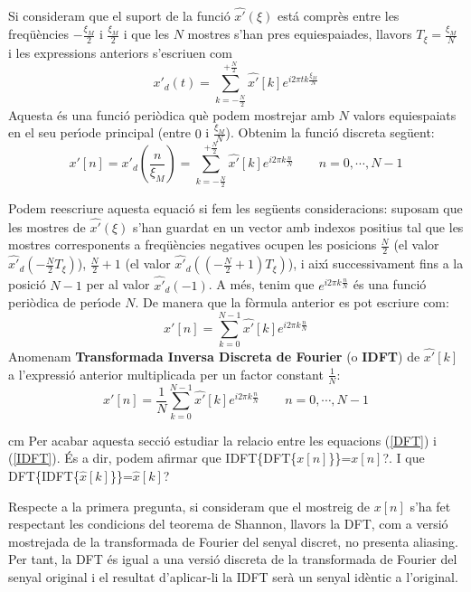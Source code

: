 \documentclass{article}
\begin{document}
Si consideram que el suport de la funci\'o $\widehat{x'}(\xi)$ est\'a compr\`es entre
les freq\"u\`encies $-\frac{\xi_M}{2}$ i $\frac{\xi_M}{2}$ i que les $N$ mostres
s'han pres equiespaiades, llavors $T_\xi=\frac{\xi_M}{N}$ i les expressions anteriors
s'escriuen com
\begin{equation}
\label{idftcont}
x'_d(t)=\sum_{k=-\frac{N}{2}}^{+\frac{N}{2}} \widehat{x'}[k] e^{i 2 \pi t k \frac{\xi_M}{N}}
\end{equation}
Aquesta \'es una funci\'o peri\`odica qu\`e podem mostrejar amb $N$ valors equiespaiats
en el seu per\'\i ode principal (entre $0$ i $\frac{\xi_M}{N}$). Obtenim la funci\'o
discreta seg\"uent:
\[
x'[n]=x'_d(\frac{n}{\xi_M})=
\sum_{k=-\frac{N}{2}}^{+\frac{N}{2}} \widehat{x'}[k] e^{i 2 \pi k \frac{n}{N}}
\qquad n=0,\cdots, N-1
\]

Podem reescriure aquesta equaci\'o si fem les seg\"uents consideracions: 
suposam que les mostres de $\widehat{x'}(\xi)$ s'han guardat en un vector amb
indexos positius
tal que les mostres corresponents a freq\"u\`encies negatives ocupen les posicions
$\frac{N}{2}$ (el valor $\widehat{x'}_d(-\frac{N}{2}T_\xi)$), 
$\frac{N}{2}+1$ (el valor $\widehat{x'}_d((-\frac{N}{2}+1)T_\xi)$), i aix\'\i $ $ 
successivament fins a la posici\'o $N-1$ per al valor $\widehat{x'}_d(-1)$.
A m\'es, tenim que $e^{i 2 \pi k \frac{n}{N}}$ \'es una funci\'o peri\`odica de
per\'\i ode $N$. De manera que la f\`ormula anterior es pot escriure com:
\[
x'[n]=\sum_{k=0}^{N-1} \widehat{x'}[k] e^{i 2 \pi k \frac{n}{N}}
\]
Anomenam {\bf Transformada Inversa Discreta de Fourier} (o {\bf IDFT}) de 
$\widehat{x'}[k]$
a l'expressi\'o anterior multiplicada per un factor constant $\frac{1}{N}$:
\begin{equation}
\label{IDFT}
x'[n]=\frac{1}{N} \sum_{k=0}^{N-1} \widehat{x'}[k] e^{i 2 \pi k \frac{n}{N}}
\qquad n=0,\cdots,N-1
\end{equation}

 cm
Per acabar aquesta secci\'o estudiar la relacio entre les equacions (\ref{DFT})
i (\ref{IDFT}). \'Es a dir, podem afirmar que IDFT\{DFT\{$x[n]$\}\}=$x[n]$?.
\newline
I que DFT\{IDFT\{$\hat{x}[k]$\}\}=$\hat{x}[k]$?

Respecte a la primera pregunta, si consideram que el mostreig de $x[n]$ s'ha
fet respectant les condicions del teorema de Shannon, llavors la DFT, com a 
versi\'o mostrejada de la transformada de Fourier del senyal discret,
no presenta aliasing. Per tant, la DFT \'es igual a una versi\'o discreta de la
transformada de Fourier del senyal original i el resultat d'aplicar-li la IDFT
ser\`a un senyal id\`entic a l'original.
\end{document}
